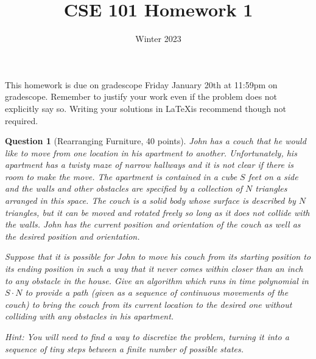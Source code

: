 \documentclass{article}
\title{CSE 101 Homework 1}
\date{Winter 2023}
\newtheorem{ques}{Question}
\begin{document}
\maketitle

This homework is due on gradescope Friday January 20th at 11:59pm on gradescope. Remember to justify your work even if the problem does not explicitly say so. Writing your solutions in \LaTeX is recommend though not required.

\begin{ques}[Rearranging Furniture, 40 points]
John has a couch that he would like to move from one location in his apartment to another. Unfortunately, his apartment has a twisty maze of narrow hallways and it is not clear if there is room to make the move. The apartment is contained in a cube $S$ feet on a side and the walls and other obstacles are specified by a collection of $N$ triangles arranged in this space. The couch is a solid body whose surface is described by $N$ triangles, but it can be moved and rotated freely so long as it does not collide with the walls. John has the current position and orientation of the couch as well as the desired position and orientation.

Suppose that it is possible for John to move his couch from its starting position to its ending position in such a way that it never comes within closer than an inch to any obstacle in the house. Give an algorithm which runs in time polynomial in $S\cdot N$ to provide a path (given as a sequence of continuous movements of the couch) to bring the couch from its current location to the desired one without colliding with any obstacles in his apartment.

Hint: You will need to find a way to discretize the problem, turning it into a sequence of tiny steps between a finite number of possible states.
\end{ques}
\end{document}
